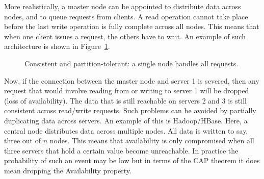 More realistically, a master node can be appointed to distribute data across
nodes, and to queue requests from clients. A read operation cannot take place
before the last write operation is fully complete across all nodes. This means
that when one client issues a request, the others have to wait. An example of
such architecture is shown in Figure~\ref{fig:cp}.
\begin{figure}[h]
\centering
{}
\caption{Consistent and partition-tolerant: a single node handles all requests.}
\label{fig:cp}
\end{figure}
Now, if the connection between the master node and server 1 is severed, then
any request that would involve reading from or writing to server 1 will be
dropped (loss of availability). The data that is still reachable on servers 2
and 3 is still consistent across read/write requests.  Such problems can
be avoided by partially duplicating data across servers. An example of this is
Hadoop/HBase. Here, a central node distributes data across multiple nodes.
All data is written to say, three out of $n$ nodes. This means that
availability is only compromised when all three servers that hold a certain
value become unreachable. In practice the probability of such an event may be
low but in terms of the CAP theorem it does mean dropping the Availability
property.


